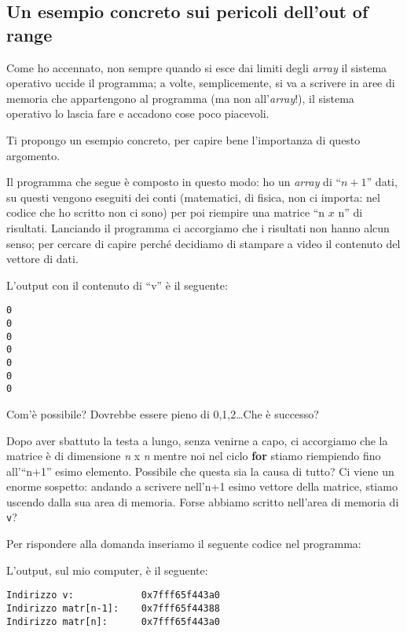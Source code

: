 \subsection{Un esempio concreto sui pericoli dell'out of range}
Come ho accennato, non sempre quando si esce dai limiti degli \emph{array} il sistema operativo uccide il programma; a volte, semplicemente, si va a scrivere in aree di memoria che appartengono al programma (ma non all'\emph{array}!), il sistema operativo lo lascia fare e accadono cose poco piacevoli. 

Ti propongo un esempio concreto, per capire bene l'importanza di questo argomento.

Il programma che segue è composto in questo modo: ho un \emph{array} di ``$n+1$'' dati, su questi vengono eseguiti dei conti (matematici, di fisica, non ci importa: nel codice che ho scritto non ci sono) per poi riempire una matrice ``n $x$ n'' di risultati. Lanciando il programma ci accorgiamo che i risultati non hanno alcun senso; per cercare di capire perché decidiamo di stampare a video il contenuto del vettore di dati.

L'output con il contenuto di ``v'' è il seguente:
\begin{shaded}\begin{verbatim}
0
0
0
0
0
0
0
\end{verbatim}
\end{shaded}

Com'è possibile? Dovrebbe essere pieno di 0,1,2\ldots Che è successo?

Dopo aver sbattuto la testa a lungo, senza venirne a capo, ci accorgiamo che la matrice è di dimensione \emph{n} x \emph{n}  mentre noi nel ciclo \textbf{for} stiamo riempiendo fino all'``n+1'' esimo elemento. Possibile che questa sia la causa di tutto? Ci viene un enorme sospetto: andando a scrivere nell'n+1 esimo vettore della matrice, stiamo uscendo dalla sua area di memoria. Forse abbiamo scritto nell'area di memoria di \verb|v|? 

Per rispondere alla domanda inseriamo il seguente codice nel programma:

L'output, sul mio computer, è il seguente:
\begin{shaded}
\begin{verbatim}
Indirizzo v:            0x7fff65f443a0
Indirizzo matr[n-1]:    0x7fff65f44388
Indirizzo matr[n]:      0x7fff65f443a0
\end{verbatim}
\end{shaded}

